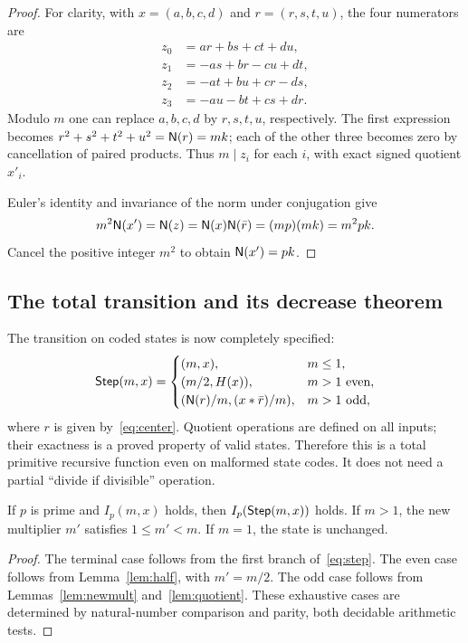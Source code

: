 \begin{proof}
For clarity, with $x=(a,b,c,d)$ and $r=(r,s,t,u)$, the four numerators are
\begin{align*}
 z_0&= ar+bs+ct+du,\\
 z_1&=-as+br-cu+dt,\\
 z_2&=-at+bu+cr-ds,\\
 z_3&=-au-bt+cs+dr.
\end{align*}
Modulo $m$ one can replace $a,b,c,d$ by $r,s,t,u$, respectively.
The first expression becomes $r^2+s^2+t^2+u^2=\mathsf N(r)=mk$;
each of the other three becomes zero by cancellation of paired products.
Thus $m\mid z_i$ for each $i$, with exact signed quotient $x'_i$.

Euler's identity and invariance of the norm under conjugation give
\[
 m^2\mathsf N(x')=\mathsf N(z)
 =\mathsf N(x)\mathsf N(\bar r)
 =(mp)(mk)=m^2pk.
\]
Cancel the positive integer $m^2$ to obtain $\mathsf N(x')=pk$.
\end{proof}

\subsection{The total transition and its decrease theorem}

The transition on coded states is now completely specified:
\begin{equation}
\label{eq:step}
 \mathsf{Step}(m,x)=
 \begin{cases}
 (m,x),&m\le1,\\
 (m/2,H(x)),&m>1\text{ even},\\
 (\mathsf N(r)/m,(x*\bar r)/m),&m>1\text{ odd},
 \end{cases}
\end{equation}
where $r$ is given by~\eqref{eq:center}. Quotient operations are defined
on all inputs; their exactness is a proved property of valid states.
Therefore this is a total primitive recursive function even on malformed
state codes. It does not need a partial ``divide if divisible'' operation.

\begin{proposition}
\label{prop:step}
If $p$ is prime and $I_p(m,x)$ holds, then $I_p(\mathsf{Step}(m,x))$ holds.
If $m>1$, the new multiplier $m'$ satisfies $1\le m'<m$.
If $m=1$, the state is unchanged.
\end{proposition}

\begin{proof}
The terminal case follows from the first branch of~\eqref{eq:step}.
The even case follows from Lemma~\ref{lem:half}, with $m'=m/2$.
The odd case follows from Lemmas~\ref{lem:newmult} and~\ref{lem:quotient}.
These exhaustive cases are determined by natural-number comparison and
parity, both decidable arithmetic tests.
\end{proof}

